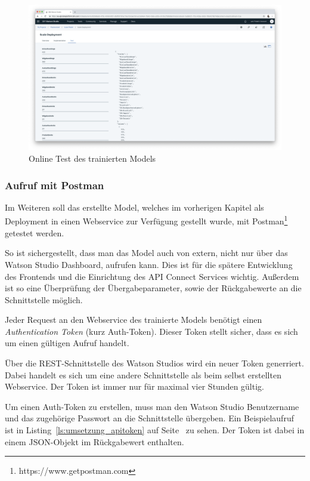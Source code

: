 \begin{figure}[h]
    \centering
    \includegraphics[width=\textwidth]{images/kapitel_3/deployment_test.png}
    \caption{Online Test des trainierten Models}
    \label{fig:umsetzung_deployment_test}
\end{figure}

\subsubsection{Aufruf mit Postman}
\label{subsec:Aufruf mit Postman}
Im Weiteren soll das erstellte Model, welches im vorherigen Kapitel als Deployment in einen Webservice zur Verfügung
gestellt wurde, mit Postman\footnote{https://www.getpostman.com} getestet werden.

So ist sichergestellt, dass man das Model auch von extern, nicht nur über das Watson Studio Dashboard, aufrufen kann.
Dies ist für die spätere Entwicklung des Frontends und die Einrichtung des API Connect Services wichtig. Außerdem ist
so eine Überprüfung der Übergabeparameter, sowie der Rückgabewerte an die Schnittstelle möglich.

Jeder Request an den Webservice des trainierte Models benötigt einen \textit{Authentication Token} (kurz Auth-Token).
Dieser Token stellt sicher, dass es sich um einen gültigen Aufruf handelt.

Über die REST-Schnittstelle des Watson Studios wird ein neuer Token generriert. Dabei handelt es sich um eine andere
Schnittstelle als beim selbst erstellten Webservice. Der Token ist immer nur für maximal vier Stunden gültig.

Um einen Auth-Token zu erstellen, muss man den Watson Studio Benutzername und das zugehörige Passwort an die
Schnittstelle übergeben. Ein Beispielaufruf ist in Listing~\ref{ls:umsetzung_apitoken} auf
Seite~\pageref{ls:umsetzung_apitoken} zu sehen. Der Token ist dabei in einem JSON-Objekt im Rückgabewert enthalten.

